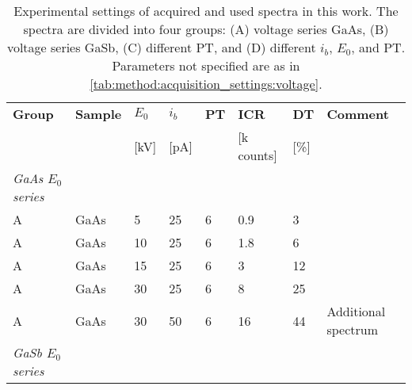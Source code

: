 \begin{table}[phtb]
    \begin{center}
        \caption{
            Experimental settings of acquired and used spectra in this work.
            The spectra are divided into four groups: (A) voltage series GaAs, (B) voltage series GaSb, (C) different PT, and (D) different $i_b$, $E_0$, and PT.
            Parameters not specified are as in \cref{tab:method:acquisition_settings:voltage}.
        }
        \renewcommand*{\arraystretch}{1.2}
        \label{tab:method:acquisition_settings:all_spectra}
        \begin{tabular}{lllllllp{3.5cm}}
            \hline
            \textbf{Group}                     & \textbf{Sample} & \textbf{$E_0$} & \textbf{$i_b$} & \textbf{PT} & \textbf{ICR} & \textbf{DT} & \textbf{Comment}    \\
                                               &                 & [kV]           & [pA]           &             & [k counts]   & [\%]        &                     \\
            \hline
            \emph{GaAs $E_0$ series}           &                 &                &                &             &              &             &                     \\
            A                                  & GaAs            & 5              & 25             & 6           & 0.9         & 3           &                     \\
            A                                  & GaAs            & 10             & 25             & 6           & 1.8         & 6           &                     \\
            A                                  & GaAs            & 15             & 25             & 6           & 3          & 12          &                     \\
            A                                  & GaAs            & 30             & 25             & 6           & 8            & 25          &                     \\
            A                                  & GaAs            & 30             & 50             & 6           & 16         & 44          & Additional spectrum \\
            \hline
            \emph{GaSb $E_0$ series  }         &                 &                &                &             &              &             &                     \\

\end{tabular}
\end{center}
\end{table}

